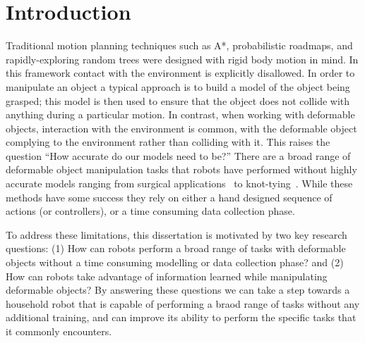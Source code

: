 \chapter{Introduction}


Traditional motion planning techniques such as A*, probabilistic roadmaps, and rapidly-exploring random trees were designed with rigid body motion in mind. In this framework contact with the environment is explicitly disallowed. In order to manipulate an object a typical approach is to build a model of the object being grasped; this model is then used to ensure that the object does not collide with anything during a particular motion. In contrast, when working with deformable objects, interaction with the environment is common, with the deformable object complying to the environment rather than colliding with it. This raises the question ``How accurate do our models need to be?'' There are a broad range of deformable object manipulation tasks that robots have performed without highly accurate models ranging from surgical applications~\cite{Wang2018} to knot-tying~\cite{Huang2015}. While these methods have some success they rely on either a hand designed sequence of actions (or controllers), or a time consuming data collection phase.

To address these limitations, this dissertation is motivated by two key research questions: (1) How can robots perform a broad range of tasks with deformable objects without a time consuming modelling or data collection phase? and (2) How can robots take advantage of information learned while manipulating deformable objects? By answering these questions we can take a step towards a household robot that is capable of performing a braod range of tasks without any additional training, and can improve its ability to perform the specific tasks that it commonly encounters.

